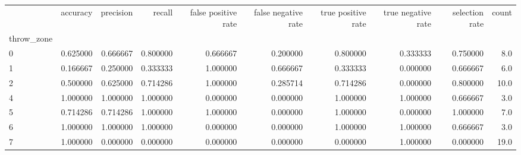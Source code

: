 \begin{tabular}{lrrrrrrrrr}
\toprule
{} &  accuracy &  precision &    recall &  false positive rate &  false negative rate &  true positive rate &  true negative rate &  selection rate &  count \\
throw\_zone &           &            &           &                      &                      &                     &                     &                 &        \\
\midrule
0          &  0.625000 &   0.666667 &  0.800000 &             0.666667 &             0.200000 &            0.800000 &            0.333333 &        0.750000 &    8.0 \\
1          &  0.166667 &   0.250000 &  0.333333 &             1.000000 &             0.666667 &            0.333333 &            0.000000 &        0.666667 &    6.0 \\
2          &  0.500000 &   0.625000 &  0.714286 &             1.000000 &             0.285714 &            0.714286 &            0.000000 &        0.800000 &   10.0 \\
4          &  1.000000 &   1.000000 &  1.000000 &             0.000000 &             0.000000 &            1.000000 &            1.000000 &        0.666667 &    3.0 \\
5          &  0.714286 &   0.714286 &  1.000000 &             1.000000 &             0.000000 &            1.000000 &            0.000000 &        1.000000 &    7.0 \\
6          &  1.000000 &   1.000000 &  1.000000 &             0.000000 &             0.000000 &            1.000000 &            1.000000 &        0.666667 &    3.0 \\
7          &  1.000000 &   0.000000 &  0.000000 &             0.000000 &             0.000000 &            0.000000 &            1.000000 &        0.000000 &   19.0 \\
\bottomrule
\end{tabular}
